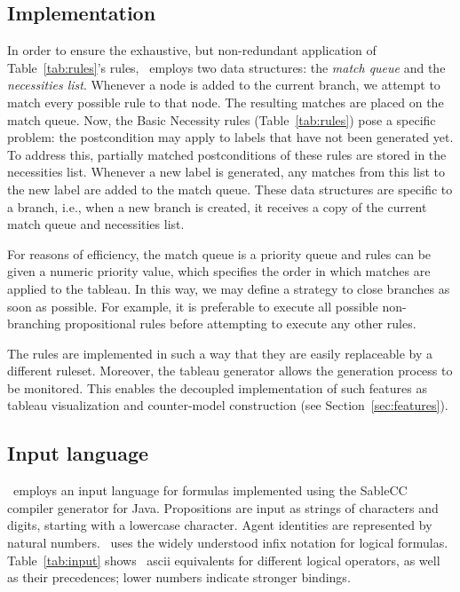 \subsection{Implementation}
\label{sec:implementation}
In order to ensure the exhaustive, but non-redundant application of Table~\ref{tab:rules}'s rules,
\oops\ employs two data structures: the {\em match queue} and the {\em
necessities list}.
Whenever a node is added to the current branch, we attempt to match every
possible
rule to that node. The resulting matches are placed on the match queue. Now,
the Basic Necessity rules (Table~\ref{tab:rules}) pose a specific problem:
the postcondition may apply to labels that have not been generated yet. To
address this, partially matched postconditions of these rules are stored in
the necessities list. Whenever a new label is generated, any matches from this
list to the new label are added to the match queue.
These data structures are specific to a branch, i.e., when
a new branch is created, it receives a copy of the current match queue and
necessities list.

For reasons of efficiency,
the match queue is a priority queue and rules can be given a numeric
priority value, which specifies the order in which matches are applied to the
tableau. In this way, we may define a strategy to close branches as soon as
possible. For example, it is preferable to execute all possible non-branching
propositional rules before attempting to execute any other rules.

The rules are implemented in such a way that they are easily replaceable by a
different ruleset.
Moreover, the tableau generator allows the generation process to be monitored.
This enables the decoupled implementation of such features as tableau
visualization and counter-model construction (see Section~\ref{sec:features}).

\subsection{Input language}
\label{sec:language}

\oops\ employs an input language for formulas implemented using the SableCC
\citep{gagnon1998} compiler generator for Java. Propositions are input as
strings of characters and digits, starting with a lowercase character.  Agent
identities are represented by natural numbers. \oops\ uses the widely
understood infix notation for logical formulas. Table~\ref{tab:input} shows \oops\ ascii equivalents for different logical operators, as well as their precedences; lower numbers indicate stronger bindings.

